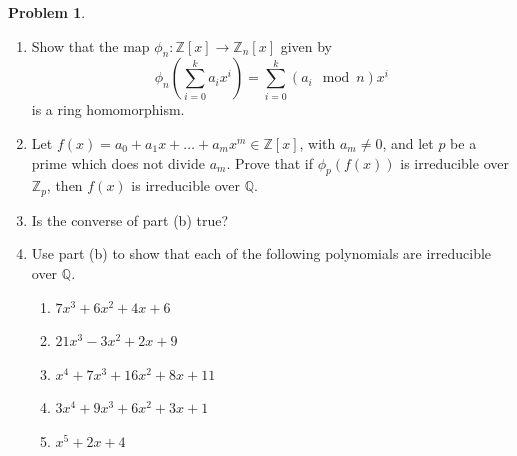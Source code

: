 \documentclass[10pt]{article}
\theoremstyle{definition}
\newtheorem{problem}{Problem}
\begin{document}
\begin{problem}
\begin{enumerate}[label=(\alph*)]
  \item Show that the map $\phi_n:\mathbb{Z}[x]\to \mathbb{Z}_n[x]$ given by
        $$\phi_n\left(\sum_{i=0}^{k}a_ix^i\right)=\sum_{i=0}^{k}\left(a_i\mod n\right)x^i$$
        is a ring homomorphism.
  \item Let $f (x) = a_0 + a_1x + \dots + a_mx^m\in\mathbb{Z}[x]$, with $a_m\neq 0$, and let
        $p$ be a prime which does not divide $a_m$. Prove that if $\phi_p(f(x))$
        is irreducible over $\mathbb{Z}_p$, then $f (x)$ is irreducible over $\mathbb{Q}$.
  \item Is the converse of part (b) true?
  \item Use part (b) to show that each of the following polynomials are
        irreducible over $\mathbb{Q}$.
        \begin{enumerate}[label=(\roman*)]
          \item $7x^3 + 6x^2 + 4x + 6$
          \item $21x^3 - 3x^2 + 2x + 9$
          \item $x^4 + 7x^3 + 16x^2 + 8x + 11$
          \item $3x^4 + 9x^3 + 6x^2 + 3x + 1$
          \item $x^5 + 2x + 4$
        \end{enumerate}
\end{enumerate}
\end{problem}
\end{document}
